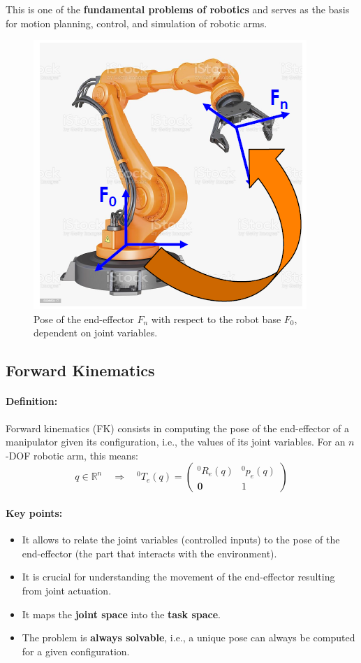 This is one of the \textbf{fundamental problems of robotics} and serves as the basis for motion planning, control, and simulation of robotic arms.

\begin{figure}[H]
  \centering
  \includegraphics[width=0.4\linewidth]{imgs/forward_kinematics_robot_arm.png}
  \caption{Pose of the end-effector $F_n$ with respect to the robot base $F_0$, dependent on joint variables.}
\end{figure}

\hfill

\subsection{Forward Kinematics}

\paragraph{Definition:}
Forward kinematics (FK) consists in computing the pose of the end-effector of a manipulator given its configuration, i.e., the values of its joint variables. For an $n$-DOF robotic arm, this means:
\[
q \in \mathbb{R}^n \quad \Rightarrow \quad {}^0T_e(q) =
\begin{pmatrix}
{}^0R_e(q) & {}^0p_e(q) \\
\mathbf{0} & 1
\end{pmatrix}
\]

\paragraph{Key points:}
\begin{itemize}
  \item It allows to relate the joint variables (controlled inputs) to the pose of the end-effector (the part that interacts with the environment).
  \item It is crucial for understanding the movement of the end-effector resulting from joint actuation.
  \item It maps the \textbf{joint space} into the \textbf{task space}.
  \item The problem is \textbf{always solvable}, i.e., a unique pose can always be computed for a given configuration.
\end{itemize}

